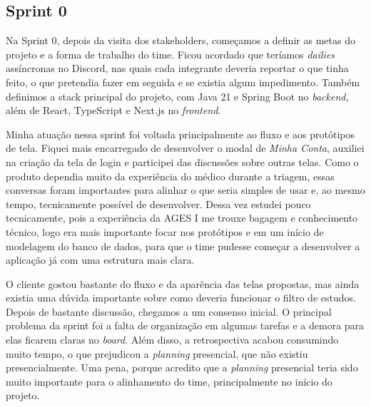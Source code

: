 \subsection{Sprint 0}

Na Sprint 0, depois da visita dos stakeholders, começamos a definir as metas do projeto e a forma de trabalho do time. Ficou acordado que teríamos \textit{dailies} assíncronas no Discord, nas quais cada integrante deveria reportar o que tinha feito, o que pretendia fazer em seguida e se existia algum impedimento. Também definimos a stack principal do projeto, com Java 21 e Spring Boot no \textit{backend}, além de React, TypeScript e Next.js no \textit{frontend}.

Minha atuação nessa sprint foi voltada principalmente ao fluxo e aos protótipos de tela. Fiquei mais encarregado de desenvolver o modal de \textit{Minha Conta}, auxiliei na criação da tela de login e participei das discussões sobre outras telas. Como o produto dependia muito da experiência do médico durante a triagem, essas conversas foram importantes para alinhar o que seria simples de usar e, ao mesmo tempo, tecnicamente possível de desenvolver. Dessa vez estudei pouco tecnicamente, pois a experiência da AGES I me trouxe bagagem e conhecimento técnico, logo era mais importante focar nos protótipos e em um início de modelagem do banco de dados, para que o time pudesse começar a desenvolver a aplicação já com uma estrutura mais clara.

O cliente gostou bastante do fluxo e da aparência das telas propostas, mas ainda existia uma dúvida importante sobre como deveria funcionar o filtro de estudos. Depois de bastante discussão, chegamos a um consenso inicial. O principal problema da sprint foi a falta de organização em algumas tarefas e a demora para elas ficarem claras no \textit{board}. Além disso, a retrospectiva acabou consumindo muito tempo, o que prejudicou a \textit{planning} presencial, que não existiu presencialmente. Uma pena, porque acredito que a \textit{planning} presencial teria sido muito importante para o alinhamento do time, principalmente no início do projeto.
